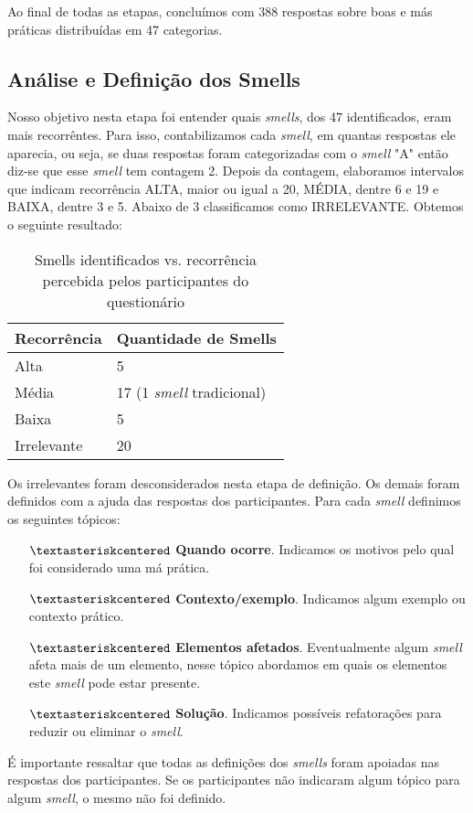 Ao final de todas as etapas, conclu\'imos com 388 respostas sobre boas e m\'as pr\'aticas distribu\'idas em 47 categorias. 

\subsection{An\'alise e Defini\c{c}\~ao dos Smells}
\label{sub:analisys-definition}

Nosso objetivo nesta etapa foi entender quais \textit{smells}, dos 47 identificados, eram mais recorr\^entes. Para isso, contabilizamos cada \textit{smell}, em quantas respostas ele aparecia, ou seja, se duas respostas foram categorizadas com o \textit{smell} "A" ent\~ao diz-se que esse \textit{smell} tem contagem 2. Depois da contagem, elaboramos intervalos que indicam recorr\^encia ALTA, maior ou igual a 20, M\'EDIA, dentre 6 e 19 e BAIXA, dentre 3 e 5. Abaixo de 3 classificamos como IRRELEVANTE. Obtemos o seguinte resultado:

\begin{table}[h]
\centering
\caption{Smells identificados vs. recorr\^encia percebida pelos participantes do question\'ario}
\begin{tabular}{p{3cm}|p{4cm}}
\textbf{Recorr\^encia} & \textbf{Quantidade de Smells} \\
\hline
Alta  			& 5 \\
M\'edia 		& 17 (1 \textit{smell} tradicional) \\
Baixa			& 5 \\
Irrelevante 	& 20 \\
\end{tabular}
\label{tab:DadosDemograficos2}
\end{table}

Os irrelevantes foram desconsiderados nesta etapa de defini\c{c}\~ao. Os demais foram definidos com a ajuda das respostas dos participantes. Para cada \textit{smell} definimos os seguintes t\'opicos: 

\begin{itemize} 
	\item[$\textasteriskcentered$] \textbf{Quando ocorre}. Indicamos os motivos pelo qual foi considerado uma m\'a pr\'atica.   
	\item[$\textasteriskcentered$] \textbf{Contexto/exemplo}. Indicamos algum exemplo ou contexto pr\'atico. 
	\item[$\textasteriskcentered$] \textbf{Elementos afetados}. Eventualmente algum \textit{smell} afeta mais de um elemento, nesse t\'opico abordamos em quais os elementos este \textit{smell} pode estar presente. 
	\item[$\textasteriskcentered$] \textbf{Solu\c{c}\~ao}. Indicamos poss\'iveis refatora\c{c}\~oes para reduzir ou eliminar o \textit{smell}. \\
\end{itemize}

\'E importante ressaltar que todas as defini\c{c}\~oes dos \textit{smells} foram apoiadas nas respostas dos participantes. Se os participantes n\~ao indicaram algum t\'opico para algum \textit{smell}, o mesmo n\~ao foi definido. \\

